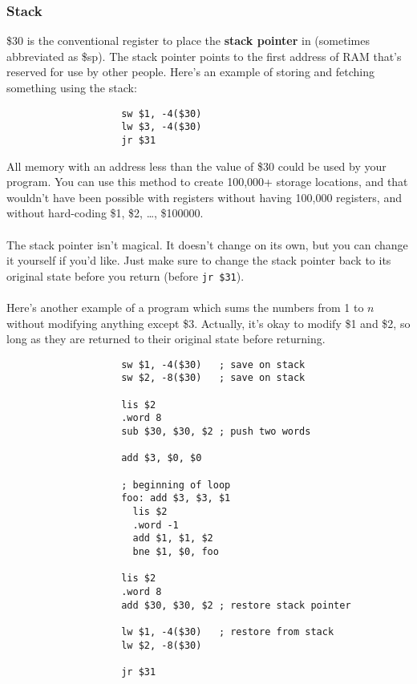 \documentclass[]{article}
\theoremstyle{definition}
\begin{document}
			\subsubsection{Stack}
				\$30 is the conventional register to place the \textbf{stack pointer} in (sometimes abbreviated as \$sp). The stack pointer points to the first address of RAM that's reserved for use by other people. Here's an example of storing and fetching something using the stack:
				\begin{verbatim}
					sw $1, -4($30)
					lw $3, -4($30)
					jr $31
				\end{verbatim}
				All memory with an address less than the value of \$30 could be used by your program. You can use this method to create 100,000+ storage locations, and that wouldn't have been possible with registers without having 100,000 registers, and without hard-coding \$1, \$2, \ldots, \$100000.
				\\ \\
				The stack pointer isn't magical. It doesn't change on its own, but you can change it yourself if you'd like. Just make sure to change the stack pointer back to its original state before you return (before \verb+jr $31+).
				\\ \\
				Here's another example of a program which sums the numbers from 1 to $n$ without modifying anything except \$3. Actually, it's okay to modify \$1 and \$2, so long as they are returned to their original state before returning.
				\begin{verbatim}
					sw $1, -4($30)   ; save on stack
					sw $2, -8($30)   ; save on stack
					
					lis $2
					.word 8
					sub $30, $30, $2 ; push two words

					add $3, $0, $0

					; beginning of loop
					foo: add $3, $3, $1
					  lis $2
					  .word -1
					  add $1, $1, $2
					  bne $1, $0, foo

					lis $2
					.word 8
					add $30, $30, $2 ; restore stack pointer

					lw $1, -4($30)   ; restore from stack
					lw $2, -8($30)

					jr $31
				\end{verbatim}
\end{document}
